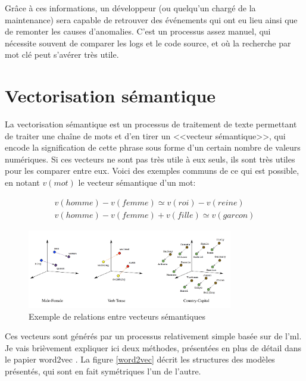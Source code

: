 \documentclass[openany, 11pt]{memoir}
\begin{document}
Grâce à ces informations, un développeur (ou quelqu'un chargé de la maintenance) sera capable de retrouver des événements qui ont eu lieu ainsi que de remonter les causes d'anomalies. C'est un processus assez manuel, qui nécessite souvent de comparer les logs et le code source, et où la recherche par mot clé peut s'avérer très utile.


\section{Vectorisation sémantique}
\label{vectorisationsemantique}

La vectorisation sémantique est un processus de traitement de texte permettant de traiter une chaîne de mots et d'en tirer un <<vecteur sémantique>>, qui encode la signification de cette phrase sous forme d'un certain nombre de valeurs numériques. Si ces vecteurs ne sont pas très utile à eux seuls, ils sont très utiles pour les comparer entre eux. Voici des exemples communs de ce qui est possible, en notant $v(mot)$ le vecteur sémantique d'un mot:

\begin{equation}
\begin{split}
	v(homme) - v(femme) \simeq v(roi) - v(reine)\\
	v(homme) - v(femme) + v(fille) \simeq v(garcon)
\end{split}
\end{equation}

\begin{figure}[ht]
	\centering
	\includegraphics[width=0.8\textwidth]{images/wordvec.png}
	\caption{Exemple de relations entre vecteurs sémantiques}
	\label{wordvec}
\end{figure}

Ces vecteurs sont générés par un processus relativement simple basée sur de l'\gls{ml}. Je vais brièvement expliquer ici deux méthodes, présentées en plus de détail dans le papier word2vec \cite{word2vec}. La figure \ref{word2vec} décrit les structures des modèles présentés, qui sont en fait symétriques l'un de l'autre.
\end{document}
